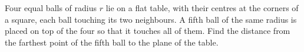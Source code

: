 Four equal balls of radius $r$ lie on a flat table, with their centres at the corners of a square, each ball touching its two neighbours. A fifth ball of the same radius is placed on top of the four so that it touches all of them. Find the distance from the farthest point of the fifth ball to the plane of the table.
